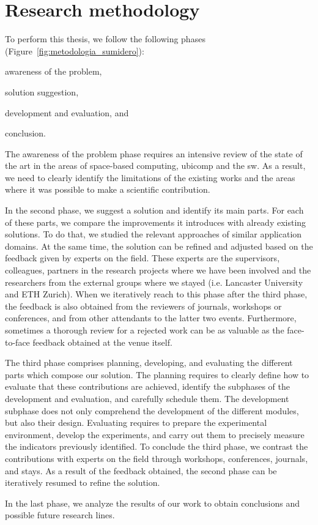 \section{Research methodology}

To perform this thesis, we follow the following phases (Figure~\ref{fig:metodologia_sumidero}):
\begin{enumerate*}[label=\itshape(\arabic*\upshape)]
  \item awareness of the problem,
  \item solution suggestion,
  \item development and evaluation, and
  \item conclusion.
\end{enumerate*}


The awareness of the problem phase requires an intensive review of the state of the art in the areas of
space-based computing, \acl{ubicomp} and the \acl{sw}.
As a result, we need to clearly identify the limitations of the existing works and the areas where it was possible to make a scientific contribution.


In the second phase, we suggest a solution and identify its main parts.
For each of these parts, we compare the improvements it introduces with already existing solutions.
To do that, we studied the relevant approaches of similar application domains.
At the same time, the solution can be refined and adjusted based on the feedback given by experts on the field.
These experts are the supervisors, colleagues, partners in the research projects where we have been involved and the researchers from the external groups where we stayed (i.e. Lancaster University and ETH Zurich). %
When we iteratively reach to this phase after the third phase, the feedback is also obtained from the reviewers of journals, workshops or conferences, and from other attendants to the latter two events.
Furthermore, sometimes a thorough review for a rejected work can be as valuable as the face-to-face feedback obtained at the venue itself. %


The third phase comprises planning, developing, and evaluating the different parts which compose our solution.
The planning requires to clearly define how to evaluate that these contributions are achieved, identify the subphases of the development and evaluation, and carefully schedule them.
The development subphase does not only comprehend the development of the different modules, but also their design.
Evaluating requires to prepare the experimental environment, develop the experiments, and carry out them to precisely measure the indicators previously identified. %
To conclude the third phase, we contrast the contributions with experts on the field through workshops, conferences, journals, and stays.
As a result of the feedback obtained, the second phase can be iteratively resumed to refine the solution.


In the last phase, we analyze the results of our work to obtain conclusions and possible future research lines.

